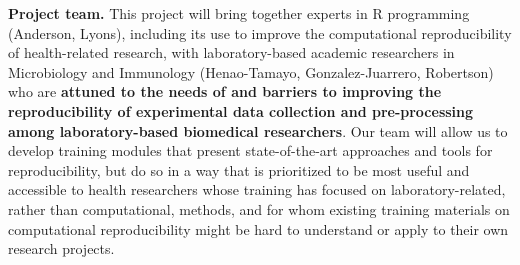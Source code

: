 \documentclass[pdftex,english,11.5pt,parskip=half]{scrartcl}
\begin{document}

\textbf{Project team.}  This project will bring together experts in R programming (Anderson, Lyons), including its use to improve the computational reproducibility of health-related research, with laboratory-based academic researchers in Microbiology and Immunology (Henao-Tamayo, Gonzalez-Juarrero, Robertson) who are \textbf{attuned to the needs of and barriers to improving the reproducibility of experimental data collection and pre-processing among laboratory-based biomedical researchers}. Our team will allow us to develop training modules that present state-of-the-art approaches and tools for reproducibility, but do so in a way that is prioritized to be most useful and accessible to health researchers whose training has focused on laboratory-related, rather than computational, methods, and for whom existing training materials on computational reproducibility might be hard to understand or apply to their own research projects. 

\endgroup
\end{document}
